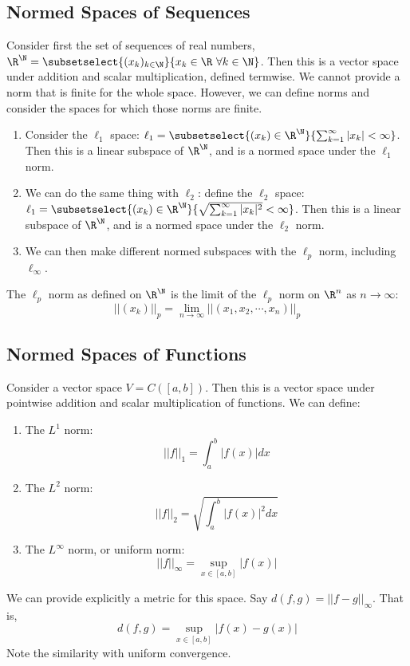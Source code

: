 \documentclass[../Main.tex]{subfiles}
\begin{document}
\subsection{Normed Spaces of Sequences}
Consider first the set of sequences of real numbers, $\R^\N = \subsetselect{(x_k)_{k \in \N}}{x_k \in \R~\forall k \in \N}$. Then this is a vector space under addition and scalar multiplication, defined termwise. We cannot provide a norm that is finite for the whole space. However, we can define norms and consider the spaces for which those norms are finite.
\begin{enumerate}
    \item Consider the $\ell_1$ space: $\ell_1 = \subsetselect{(x_k) \in \R^\N}{\sum_{k=1}^\infty |x_k| < \infty}$. Then this is a linear subspace of $\R^\N$, and is a normed space under the $\ell_1$ norm.
    \item We can do the same thing with $\ell_2$: define the $\ell_2$ space: $\ell_1 = \subsetselect{(x_k) \in \R^\N}{\sqrt{\sum_{k=1}^\infty |x_k|^2} < \infty}$. Then this is a linear subspace of $\R^\N$, and is a normed space under the $\ell_2$ norm.
    \item We can then make different normed subspaces with the $\ell_p$ norm, including $\ell_\infty$.
\end{enumerate}
\begin{remark}
    The $\ell_p$ norm as defined on $\R^\N$ is the limit of the $\ell_p$ norm on $\R^n$ as $n \to\infty$:
    \begin{equation*}
        ||(x_k)||_p = \lim_{n \to \infty} ||(x_1, x_2, \cdots, x_n)||_p
    \end{equation*}
\end{remark}
\subsection{Normed Spaces of Functions}
Consider a vector space $V = C([a, b])$. Then this is a vector space under pointwise addition and scalar multiplication of functions. We can define:
\begin{enumerate}
    \item The $L^1$ norm:
        \begin{equation*}
            ||f||_1 = \int_{a}^{b} |f(x)| dx
        \end{equation*}
    \item The $L^2$ norm:
        \begin{equation*}
            ||f||_2 = \sqrt{\int_{a}^{b} |f(x)|^2 dx}
        \end{equation*}
    \item The $L^\infty$ norm, or uniform norm:
        \begin{equation*}
            ||f||_{\infty} = \sup_{x \in [a, b]} |f(x)|
        \end{equation*}
\end{enumerate}
We can provide explicitly a metric for this space. Say $d(f, g) = ||f - g||_\infty$. That is,
\begin{equation*}
    d(f, g) = \sup_{x \in [a, b]} |f(x) - g(x)|
\end{equation*}
Note the similarity with uniform convergence.
\end{document}
